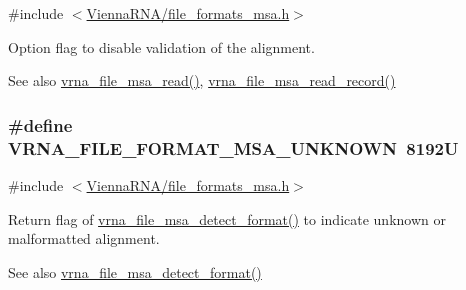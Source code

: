 {\ttfamily \#include $<$\hyperlink{file__formats__msa_8h}{Vienna\+R\+N\+A/file\+\_\+formats\+\_\+msa.\+h}$>$}



Option flag to disable validation of the alignment. 

\begin{DoxySeeAlso}{See also}
\hyperlink{group__file__utils_gad02d5d12bda54611c915a1019323b7be}{vrna\+\_\+file\+\_\+msa\+\_\+read()}, \hyperlink{group__file__utils_gad4203a438622b2df7bc2f16578d54799}{vrna\+\_\+file\+\_\+msa\+\_\+read\+\_\+record()} 
\end{DoxySeeAlso}
\subsubsection[{\texorpdfstring{V\+R\+N\+A\+\_\+\+F\+I\+L\+E\+\_\+\+F\+O\+R\+M\+A\+T\+\_\+\+M\+S\+A\+\_\+\+U\+N\+K\+N\+O\+WN}{VRNA_FILE_FORMAT_MSA_UNKNOWN}}]{\setlength{\rightskip}{0pt plus 5cm}\#define V\+R\+N\+A\+\_\+\+F\+I\+L\+E\+\_\+\+F\+O\+R\+M\+A\+T\+\_\+\+M\+S\+A\+\_\+\+U\+N\+K\+N\+O\+WN~8192U}\hypertarget{group__file__utils_gabdc948f547e550125de3e7c65878400c}{}\label{group__file__utils_gabdc948f547e550125de3e7c65878400c}


{\ttfamily \#include $<$\hyperlink{file__formats__msa_8h}{Vienna\+R\+N\+A/file\+\_\+formats\+\_\+msa.\+h}$>$}



Return flag of \hyperlink{group__file__utils_gade4fa8136ebb2d0f7eb3f8b59a8658e3}{vrna\+\_\+file\+\_\+msa\+\_\+detect\+\_\+format()} to indicate unknown or malformatted alignment. 

\begin{DoxySeeAlso}{See also}
\hyperlink{group__file__utils_gade4fa8136ebb2d0f7eb3f8b59a8658e3}{vrna\+\_\+file\+\_\+msa\+\_\+detect\+\_\+format()} 
\end{DoxySeeAlso}


